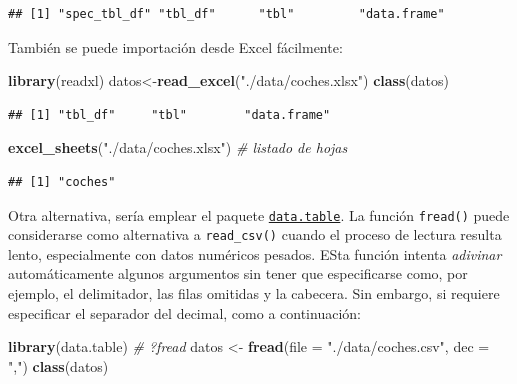 \documentclass[
]{book}
\newenvironment{Shaded}{\begin{snugshade}}{\end{snugshade}}
\newcommand{\AttributeTok}[1]{\textcolor[rgb]{0.13,0.29,0.53}{#1}}
\newcommand{\CommentTok}[1]{\textcolor[rgb]{0.56,0.35,0.01}{\textit{#1}}}
\newcommand{\FunctionTok}[1]{\textcolor[rgb]{0.13,0.29,0.53}{\textbf{#1}}}
\newcommand{\NormalTok}[1]{#1}
\newcommand{\OtherTok}[1]{\textcolor[rgb]{0.56,0.35,0.01}{#1}}
\newcommand{\StringTok}[1]{\textcolor[rgb]{0.31,0.60,0.02}{#1}}
\begin{document}
\begin{verbatim}
## [1] "spec_tbl_df" "tbl_df"      "tbl"         "data.frame"
\end{verbatim}

También se puede importación desde Excel fácilmente:

\begin{Shaded}
\begin{Highlighting}[]
\FunctionTok{library}\NormalTok{(readxl)}
\NormalTok{datos}\OtherTok{\textless{}{-}}\FunctionTok{read\_excel}\NormalTok{(}\StringTok{"./data/coches.xlsx"}\NormalTok{)}
\FunctionTok{class}\NormalTok{(datos)}
\end{Highlighting}
\end{Shaded}

\begin{verbatim}
## [1] "tbl_df"     "tbl"        "data.frame"
\end{verbatim}

\begin{Shaded}
\begin{Highlighting}[]
\FunctionTok{excel\_sheets}\NormalTok{(}\StringTok{"./data/coches.xlsx"}\NormalTok{) }\CommentTok{\# listado de hojas}
\end{Highlighting}
\end{Shaded}

\begin{verbatim}
## [1] "coches"
\end{verbatim}

Otra alternativa, sería emplear el paquete \href{https://r-datatable.com}{\texttt{data.table}}.
La función \texttt{fread()} puede considerarse como alternativa a \texttt{read\_csv()}
cuando el proceso de lectura resulta lento, especialmente con datos numéricos pesados. ESta función intenta \emph{adivinar} automáticamente algunos argumentos sin tener que especificarse como, por ejemplo, el delimitador, las filas omitidas y la cabecera. Sin embargo, si requiere especificar el separador del decimal, como a continuación:

\begin{Shaded}
\begin{Highlighting}[]
\FunctionTok{library}\NormalTok{(data.table)}
\CommentTok{\# ?fread}
\NormalTok{datos }\OtherTok{\textless{}{-}} \FunctionTok{fread}\NormalTok{(}\AttributeTok{file =} \StringTok{"./data/coches.csv"}\NormalTok{, }\AttributeTok{dec =} \StringTok{","}\NormalTok{)}
\FunctionTok{class}\NormalTok{(datos) }
\end{Highlighting}
\end{Shaded}
\end{document}
